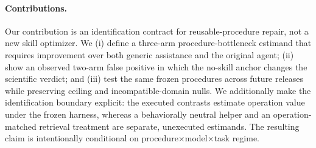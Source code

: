 \paragraph{Contributions.}
Our contribution is an identification contract for reusable-procedure repair, not a new skill optimizer. We (i) define a three-arm procedure-bottleneck estimand that requires improvement over both generic assistance and the original agent; (ii) show an observed two-arm false positive in which the no-skill anchor changes the scientific verdict; and (iii) test the same frozen procedures across future releases while preserving ceiling and incompatible-domain nulls. We additionally make the identification boundary explicit: the executed contrasts estimate operation value under the frozen harness, whereas a behaviorally neutral helper and an operation-matched retrieval treatment are separate, unexecuted estimands. The resulting claim is intentionally conditional on procedure$\times$model$\times$task regime.
